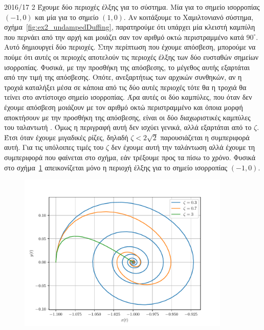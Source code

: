 \begin{solution}{2016/17 2}
    Έχουμε δύο περιοχές έλξης για το σύστημα. Μία για το σημείο ισορροπίας
    \( (-1, 0) \) και μία για το σημείο \( (1, 0) \). Αν κοιτάξουμε το
    Χαμιλτονιανό σύστημα, σχήμα~\ref{fig:ex2_undampedDuffing}, παρατηρούμε ότι
    υπάρχει μία κλειστή καμπύλη που περνάει από την αρχή και μοιάζει σαν τον αριθμό
    οκτώ περιστραμμένο κατά \( 90^{\circ} \). Αυτό δημιουργεί δύο περιοχές. Στην
    περίπτωση που έχουμε απόσβεση, μπορούμε να πούμε ότι αυτές οι περιοχές
    αποτελούν τις περιοχές έλξης των δύο ευσταθών σημείων ισορροπίας. Φυσικά, με
    την προσθήκη της απόσβεσης, το μέγεθος αυτής εξαρτάται από την τιμή της
    απόσβεσης. Οπότε, ανεξαρτήτως των αρχικών συνθηκών, αν η τροχιά καταλήξει
    μέσα σε κάποια από τις δύο αυτές περιοχές τότε θα η τροχιά θα τείνει στο
    αντίστοιχο σημείο ισορροπίας. Άρα αυτές οι δύο καμπύλες, που όταν δεν έχουμε
    απόσβεση μοιάζουν με τον αριθμό οκτώ περιστραμμένο και όποια μορφή
    αποκτήσουν με την προσθήκη της απόσβεσης, είναι οι δύο διαχωριστικές
    καμπύλες του ταλαντωτή . Όμως η περιγραφή αυτή δεν ισχύει γενικά,
    αλλά εξαρτάται από το \( \zeta \). Έτσι όταν έχουμε μιγαδικές ρίζες, δηλαδή
    \( \zeta < 2\sqrt{2} \) παρουσιάζεται η συμπεριφορά αυτή. Για τις υπόλοιπες τιμές
    του \( \zeta \) δεν έχουμε αυτή την ταλάντωση αλλά έχουμε τη συμπεριφορά που
    φαίνεται στο σχήμα, εάν τρέξουμε προς τα πίσω το χρόνο. Φυσικά στο
    σχήμα~\ref{fig:ex2_attractors} απεικονίζεται μόνο η περιοχή έλξης για το σημείο
    ισορροπίας \( (-1, 0) \).
    \begin{figure}[h!]
        \centering
        \includegraphics[width=0.9\textwidth]{figures/ex2_attractors.pdf}
        \caption{}
        \label{fig:ex2_attractors}
    \end{figure}


\end{solution}
